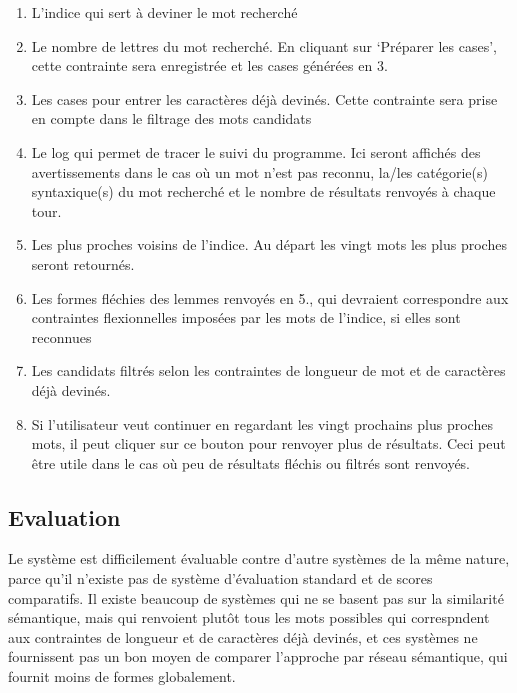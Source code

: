 \begin{enumerate}
    \item{L'indice qui sert à deviner le mot recherché}
    \item{Le nombre de lettres du mot recherché. En cliquant sur \lq{Préparer les cases}\rq, cette contrainte sera enregistrée et les cases générées en 3.}
    \item{Les cases pour entrer les caractères déjà devinés. Cette contrainte sera prise en compte dans le filtrage des mots candidats}
    \item{Le log qui permet de tracer le suivi du programme. Ici seront affichés des avertissements dans le cas où un mot n'est pas reconnu, la/les catégorie(s) syntaxique(s) du mot recherché et le nombre de résultats renvoyés à chaque tour.}
    \item{Les plus proches voisins de l'indice. Au départ les vingt mots les plus proches seront retournés.}
    \item{Les formes fléchies des lemmes renvoyés en 5., qui devraient correspondre aux contraintes flexionnelles imposées par les mots de l'indice, si elles sont reconnues}
    \item{Les candidats filtrés selon les contraintes de longueur de mot et de caractères déjà devinés.}
    \item{Si l'utilisateur veut continuer en regardant les vingt prochains plus proches mots, il peut cliquer sur ce bouton pour renvoyer plus de résultats. Ceci peut être utile dans le cas où peu de résultats fléchis ou filtrés sont renvoyés.}
    
\end{enumerate}


\subsection{Evaluation}
Le système est difficilement évaluable contre d'autre systèmes de la même nature, parce qu'il n'existe pas de système d'évaluation standard et de scores comparatifs. Il existe beaucoup de systèmes qui ne se basent pas sur la similarité sémantique, mais qui renvoient plutôt tous les mots possibles qui correspndent aux contraintes de longueur et de caractères déjà devinés, et ces systèmes ne fournissent pas un bon moyen de comparer l'approche par réseau sémantique, qui fournit moins de formes globalement.

